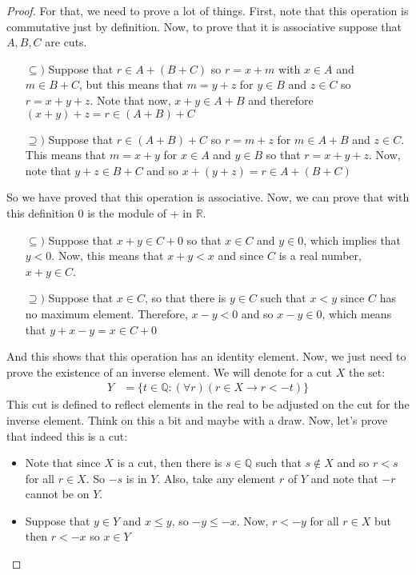 \documentclass{tufte-handout}
\begin{document}
\begin{proof}
	For that, we need to prove a lot of things. First, note that this operation is commutative just by definition. Now, to prove that it is associative suppose that $A, B, C$ are cuts.
	\begin{itemize}
		\item[$\subseteq)$] Suppose that $r \in A + (B + C)$ so $r = x + m$ with $x \in A$ and $m \in B + C$, but this means that $m = y + z$ for $y \in B$ and $z \in C$ so $r = x + y + z$. Note that now, $x + y \in A + B$ and therefore $(x + y) + z = r \in (A + B) + C$
		\item[$\supseteq)$] Suppose that $r \in (A + B) + C$ so $r = m + z$ for $m \in A + B$ and $z \in C$. This means that $m = x + y$ for $x \in A$ and $y \in B$ so that $r = x + y + z$. Now, note that $y + z \in B + C$ and so $x + (y + z) = r \in A + (B + C)$ 
	\end{itemize}
	So we have proved that this operation is associative. Now, we can prove that with this definition $0$ is the module of $+$ in $\mathbb{R}$.
	\begin{itemize}
		\item[$\subseteq)$] Suppose that $x + y \in C + 0$ so that $x \in C$ and $y \in 0$, which implies that $y < 0$. Now, this means that $x + y < x$ and since $C$ is a real number, $x + y \in C$.
		\item[$\supseteq)$] Suppose that $x \in C$, so that there is $y \in C$ such that $x < y$ since $C$ has no maximum element. Therefore, $x - y < 0$ and so $x - y \in 0$, which means that $y + x - y = x \in C + 0$ 
	\end{itemize}
	And this shows that this operation has an identity element. Now, we just need to prove the existence of an inverse element. We will denote for a cut $X$ the set:
	\begin{align*}
		Y &= \{t \in \mathbb{Q}: (\forall r)(r \in X \rightarrow r < -t)\}
	\end{align*}
	This cut is defined to reflect elements in the real to be adjusted on the cut for the inverse element. Think on this a bit and maybe with a draw. Now, let's prove that indeed this is a cut:
	\begin{itemize}
		\item Note that since $X$ is a cut, then there is $s \in \mathbb{Q}$ such that $s \not \in X$ and so $r < s$ for all $r \in X$. So $-s$ is in $Y$. Also, take any element $r$ of $Y$ and note that $-r$ cannot be on $Y$.
		\item Suppose that $y \in Y$ and $x \le y$, so $-y \le -x$. Now, $r < -y$ for all $r \in X$ but then $r < -x$ so $x \in Y$

\end{itemize}
\end{proof}
\end{document}
